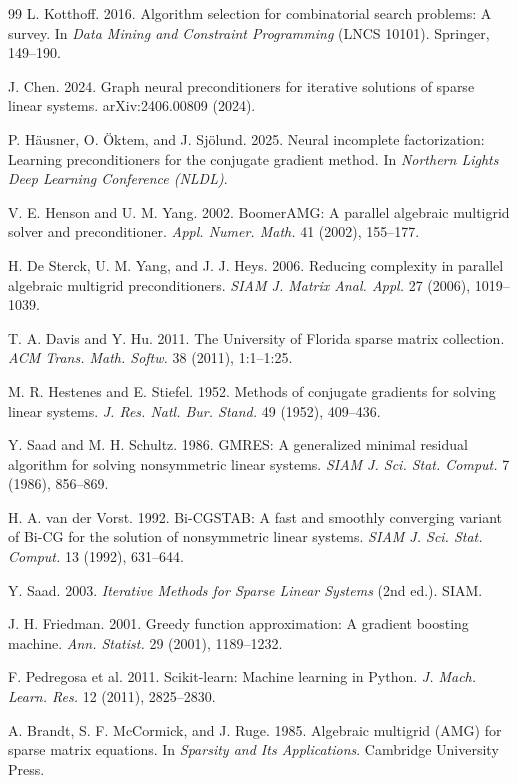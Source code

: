 \documentclass[acmsmall,screen,review]{acmart}
\begin{document}
\begin{thebibliography}{99}
 L. Kotthoff. 2016.
Algorithm selection for combinatorial search problems: A survey. In \emph{Data
Mining and Constraint Programming} (LNCS 10101). Springer, 149--190.

 J. Chen. 2024.
Graph neural preconditioners for iterative solutions of sparse linear systems.
arXiv:2406.00809 (2024).

 P. H\"ausner, O. \"Oktem, and J. Sj\"olund. 2025.
Neural incomplete factorization: Learning preconditioners for the conjugate
gradient method. In \emph{Northern Lights Deep Learning Conference (NLDL)}.

 V. E. Henson and U. M. Yang. 2002.
BoomerAMG: A parallel algebraic multigrid solver and preconditioner.
\emph{Appl. Numer. Math.} 41 (2002), 155--177.

 H. De Sterck, U. M. Yang, and J. J. Heys. 2006.
Reducing complexity in parallel algebraic multigrid preconditioners.
\emph{SIAM J. Matrix Anal. Appl.} 27 (2006), 1019--1039.

 T. A. Davis and Y. Hu. 2011.
The University of Florida sparse matrix collection.
\emph{ACM Trans. Math. Softw.} 38 (2011), 1:1--1:25.

 M. R. Hestenes and E. Stiefel. 1952.
Methods of conjugate gradients for solving linear systems.
\emph{J. Res. Natl. Bur. Stand.} 49 (1952), 409--436.

 Y. Saad and M. H. Schultz. 1986.
GMRES: A generalized minimal residual algorithm for solving nonsymmetric
linear systems. \emph{SIAM J. Sci. Stat. Comput.} 7 (1986), 856--869.

 H. A. van der Vorst. 1992.
Bi-CGSTAB: A fast and smoothly converging variant of Bi-CG for the solution of
nonsymmetric linear systems.
\emph{SIAM J. Sci. Stat. Comput.} 13 (1992), 631--644.

 Y. Saad. 2003.
\emph{Iterative Methods for Sparse Linear Systems} (2nd ed.). SIAM.

 J. H. Friedman. 2001.
Greedy function approximation: A gradient boosting machine.
\emph{Ann. Statist.} 29 (2001), 1189--1232.

 F. Pedregosa et al. 2011.
Scikit-learn: Machine learning in Python.
\emph{J. Mach. Learn. Res.} 12 (2011), 2825--2830.

 A. Brandt, S. F. McCormick, and J. Ruge. 1985.
Algebraic multigrid (AMG) for sparse matrix equations. In \emph{Sparsity and
Its Applications}. Cambridge University Press.


\end{thebibliography}
\end{document}

